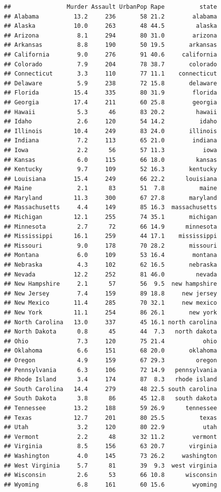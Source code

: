 \documentclass[
]{article}
\begin{document}
\begin{verbatim}
##                Murder Assault UrbanPop Rape          state
## Alabama          13.2     236       58 21.2        alabama
## Alaska           10.0     263       48 44.5         alaska
## Arizona           8.1     294       80 31.0        arizona
## Arkansas          8.8     190       50 19.5       arkansas
## California        9.0     276       91 40.6     california
## Colorado          7.9     204       78 38.7       colorado
## Connecticut       3.3     110       77 11.1    connecticut
## Delaware          5.9     238       72 15.8       delaware
## Florida          15.4     335       80 31.9        florida
## Georgia          17.4     211       60 25.8        georgia
## Hawaii            5.3      46       83 20.2         hawaii
## Idaho             2.6     120       54 14.2          idaho
## Illinois         10.4     249       83 24.0       illinois
## Indiana           7.2     113       65 21.0        indiana
## Iowa              2.2      56       57 11.3           iowa
## Kansas            6.0     115       66 18.0         kansas
## Kentucky          9.7     109       52 16.3       kentucky
## Louisiana        15.4     249       66 22.2      louisiana
## Maine             2.1      83       51  7.8          maine
## Maryland         11.3     300       67 27.8       maryland
## Massachusetts     4.4     149       85 16.3  massachusetts
## Michigan         12.1     255       74 35.1       michigan
## Minnesota         2.7      72       66 14.9      minnesota
## Mississippi      16.1     259       44 17.1    mississippi
## Missouri          9.0     178       70 28.2       missouri
## Montana           6.0     109       53 16.4        montana
## Nebraska          4.3     102       62 16.5       nebraska
## Nevada           12.2     252       81 46.0         nevada
## New Hampshire     2.1      57       56  9.5  new hampshire
## New Jersey        7.4     159       89 18.8     new jersey
## New Mexico       11.4     285       70 32.1     new mexico
## New York         11.1     254       86 26.1       new york
## North Carolina   13.0     337       45 16.1 north carolina
## North Dakota      0.8      45       44  7.3   north dakota
## Ohio              7.3     120       75 21.4           ohio
## Oklahoma          6.6     151       68 20.0       oklahoma
## Oregon            4.9     159       67 29.3         oregon
## Pennsylvania      6.3     106       72 14.9   pennsylvania
## Rhode Island      3.4     174       87  8.3   rhode island
## South Carolina   14.4     279       48 22.5 south carolina
## South Dakota      3.8      86       45 12.8   south dakota
## Tennessee        13.2     188       59 26.9      tennessee
## Texas            12.7     201       80 25.5          texas
## Utah              3.2     120       80 22.9           utah
## Vermont           2.2      48       32 11.2        vermont
## Virginia          8.5     156       63 20.7       virginia
## Washington        4.0     145       73 26.2     washington
## West Virginia     5.7      81       39  9.3  west virginia
## Wisconsin         2.6      53       66 10.8      wisconsin
## Wyoming           6.8     161       60 15.6        wyoming
\end{verbatim}
\end{document}
